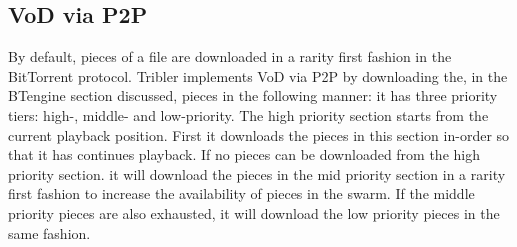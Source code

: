\subsection{VoD via P2P} 
By default, pieces of a file are downloaded in a rarity first fashion in the BitTorrent protocol. Tribler implements VoD via P2P by downloading the, in the BTengine section discussed, pieces in the following manner\cite{libswift12}: it has three priority tiers: high-, middle- and low-priority. The high priority section starts from the current playback position. First it downloads the pieces in this section in-order so that it has continues playback. If no pieces can be downloaded from the high priority section. it will download the pieces in the mid priority section in a rarity first fashion to increase the availability of pieces in the swarm. If the middle priority pieces are also exhausted, it will download the low priority pieces in the same fashion. 

